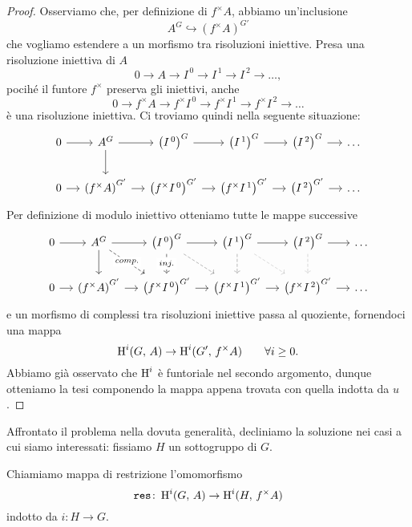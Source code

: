 \begin{proof}
	Osserviamo che, per definizione di $ f^\times A $, abbiamo un'inclusione
	\[ A^G \hookrightarrow \left(f^\times A\right)^{G'} \]
	che vogliamo estendere a un morfismo tra risoluzioni iniettive. Presa una risoluzione iniettiva di $ A $
	\[ 0 \to A \to I^{\,0} \to I^{\,1} \to I^{\,2} \to \dots, \]
	pocihé il funtore $ f^\times $ preserva gli iniettivi, anche
	\[ 0 \to f^\times A \to f^\times I^{\,0} \to f^\times I^{\,1} \to f^\times I^{\,2} \to \dots \]
	è una risoluzione iniettiva. Ci troviamo quindi nella seguente situazione:
	\[\begin{tikzcd}[column sep = small]
	0 \rar & A^G \rar \dar & \left(I^{\,0}\right)^G \rar & \left(I^{\,1}\right)^G \rar & \left(I^{\,2}\right)^G \rar & \dots \\
	0 \rar & \left(f^\times A\right)^{G'}  \rar & \left(f^\times I^{\,0}\right)^{G'} \rar & \left(f^\times I^{\,1}\right)^{G'} \rar & \left(I^{\, 2}\right)^{G'} \rar & \dots
	\end{tikzcd} \]
	Per definizione di modulo iniettivo otteniamo tutte le mappe successive 
	\[\begin{tikzcd}[column sep = small]
	0 \rar
	& A^G \dar \rar \arrow[dashed, "comp." description]{dr}
	& \left(I^{\,0}\right)^G \rar \dar[dashed, "inj." description] \arrow[dashed, gray]{dr}
	& \left(I^{\,1}\right)^{G} \rar \dar[dashed, gray] \arrow[dashed, gray!50]{dr}
	& \left(I^{\, 2}\right)^{G} \dar[dashed, gray!50] \rar
	& \dots \\
	0 \rar
	& \left(f^\times A\right)^{G'} \rar
	& \left(f^\times I^{\,0}\right)^{G'} \rar
	& \left(f^\times I^{\,1}\right)^{G'} \rar
	& \left(f^\times I^{\,2}\right)^{G'} \rar
	& \dots
	\end{tikzcd} \]
	e un morfismo di complessi tra risoluzioni iniettive passa al quoziente, fornendoci una mappa
	\[ \operatorname{H}^i(G, \, A) \to \operatorname{H}^i(G', \, f^\times A) \qquad \forall i \geq 0. \]
	Abbiamo già osservato che $ \operatorname{H}^i $ è funtoriale nel secondo argomento, dunque otteniamo la tesi componendo la mappa appena trovata con quella indotta da $ u $.
\end{proof}

Affrontato il problema nella dovuta generalità, decliniamo la soluzione nei casi a cui siamo interessati: fissiamo $ H $ un sottogruppo di $ G $.
\begin{definition}[Restrizione]
	Chiamiamo mappa di restrizione l'omomorfismo
	\[ \operatorname{\texttt{res}} \colon \operatorname{H}^i(G, \, A) \to \operatorname{H}^i(H, \, f^\times A) \]
	indotto da $ i \colon H \to G $.
\end{definition}

